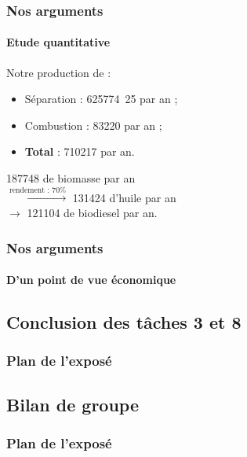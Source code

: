 \documentclass{beamer}
\begin{document}
	\begin{frame}
		\frametitle{Nos arguments}
		\framesubtitle{Etude quantitative}
		Notre production de  :
		\begin{itemize}
			\item Séparation : \unit{625774.25}{\ton} par an ;
			\item Combustion : \unit{83220}{\ton} par an ;
			\item \textbf{Total} : \unit{710217}{\ton} par an.
		\end{itemize}
		\unit{187748}{\kilo\gram\per\hectare} de biomasse par an\\
		$\xrightarrow{\text{rendement : 70\%}}$ \unit{131424}{\kilo\gram\per\hectare} d'huile par an \\
		$\rightarrow$ \unit{121104}{\kilo\gram\per\hectare} de biodiesel par an.
		
	\end{frame}

	\begin{frame}
		\frametitle{Nos arguments}
		\framesubtitle{D'un point de vue économique}
		
	\end{frame}

	\begin{frame}
		\section{Conclusion des tâches 3 et 8}
		\frametitle{Plan de l'exposé}
		\tableofcontents[currentsubsection,sectionstyle=show/shaded,subsectionstyle=show/shaded/hide]
	\end{frame}
	
	\begin{frame}
		\section{Bilan de groupe}
		\frametitle{Plan de l'exposé}
		\tableofcontents[currentsubsection,sectionstyle=show/shaded,subsectionstyle=show/shaded/hide]
	\end{frame}
	
	\begin{frame}
	\end{frame}
	
\end{document}
